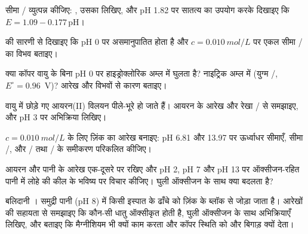 \begin{exercise}[$\star\star$]\label{exo:b1:e-ph-diagrams:6}
सीमा / व्युत्पन्न कीजिए: , उसका
 लिखिए, और pH 1.82 पर सातत्य का उपयोग करके दिखाइए कि $E = 1.09 -
0.177\,\mathrm{pH}$।
\end{exercise}

\begin{exercise}[$\star\star$]\label{exo:b1:e-ph-diagrams:7}
 की सारणी से दिखाइए कि  pH 0 पर असमानुपातित
होता है और $c = \qty{0.010}{mol/L}$ पर एकल सीमा / का
विभव बताइए।
\end{exercise}

\begin{exercise}[$\star\star$]\label{exo:b1:e-ph-diagrams:8}
क्या कॉपर वायु के बिना pH 0 पर हाइड्रोक्लोरिक अम्ल में घुलता है? नाइट्रिक
अम्ल में (युग्म /, $E^\circ = 0.96$~V)? आरेख और विभवों से
कारण बताइए।
\end{exercise}

\begin{exercise}[$\star\star$]\label{exo:b1:e-ph-diagrams:9}
वायु में छोड़े गए आयरन(II) विलयन पीले-भूरे हो जाते हैं। आयरन के आरेख और
रेखा / से समझाइए, और pH 3 पर अभिक्रिया लिखिए।
\end{exercise}

\begin{exercise}[$\star\star\star$]\label{exo:b1:e-ph-diagrams:10}
$c = \qty{0.010}{mol/L}$ के लिए ज़िंक का आरेख बनाइए: pH 6.81 और 13.97 पर
ऊर्ध्वाधर सीमाएँ, सीमा /,
और / तथा / के समीकरण परिकलित कीजिए।
\end{exercise}

\begin{exercise}[$\star\star\star$]\label{exo:b1:e-ph-diagrams:11}
आयरन और पानी के आरेख एक-दूसरे पर रखिए और pH 2, pH 7 और pH 13 पर
ऑक्सीजन-रहित पानी में लोहे की कील के भविष्य पर विचार कीजिए। घुली ऑक्सीजन के साथ
क्या बदलता है?
\end{exercise}

\begin{exercise}[$\star\star\star$]\label{exo:b1:e-ph-diagrams:12}
बलिदानी । समुद्री पानी (pH 8) में किसी इस्पात के ढाँचे को ज़िंक के
ब्लॉक से जोड़ा जाता है। आरेखों की सहायता से समझाइए कि कौन-सी धातु ऑक्सीकृत होती है, घुली
ऑक्सीजन के साथ अभिक्रियाएँ लिखिए, और बताइए कि मैग्नीशियम भी क्यों काम करता
और कॉपर स्थिति को और बिगाड़ क्यों देता।
\end{exercise}

